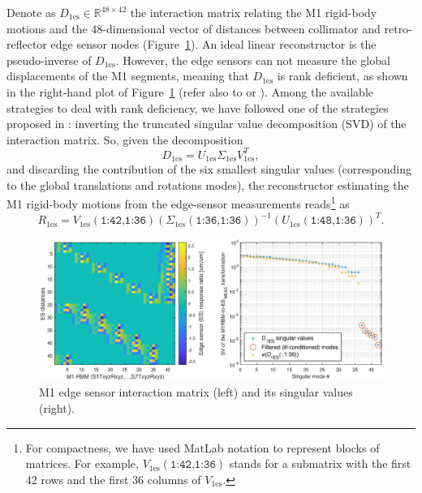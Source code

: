 \documentclass{gmto}
\begin{document}
Denote as $D_{1\text{es}} \in \mathbb{R}^{48 \times 42}$ the interaction matrix relating the M1 rigid-body motions and the $48$-dimensional vector of distances between collimator and retro-reflector edge sensor nodes (Figure~\ref{fig:D1es_sv}). An ideal linear reconstructor is the pseudo-inverse of $D_{1\text{es}}$. However, the edge sensors can not measure the global displacements of the M1 segments, meaning that $D_{1\text{es}}$ is rank deficient, as shown in the right-hand plot of Figure~\ref{fig:D1es_sv} (refer also to \cite{FWN.124} or \cite[Section~4.1]{PistonRej_QPacheco2019}). Among the available strategies to deal with rank deficiency, we have followed one of the strategies proposed in \cite[Section~2.2]{FWN.124}: inverting the truncated singular value decomposition (SVD) of the interaction matrix. So, given the decomposition 
$$D_{1\text{es}} = U_{1\text{es}} \Sigma_{1\text{es}} V_{1\text{es}}^T,$$
and discarding the contribution of the six smallest singular values (corresponding to the global translations and rotations modes), the reconstructor estimating the M1 rigid-body motions from the edge-sensor measurements reads\footnote{For compactness, we have used MatLab notation to represent blocks of matrices. For example, $V_{1\text{es}}(\texttt{1:42,1:36})$ stands for a submatrix with the first 42 rows and the first 36 columns of $V_{1\text{es}}$.} as
\begin{equation} \label{eq:R1es}
    R_{1\text{es}} = V_{1\text{es}}(\texttt{1:42,1:36}) \left(\Sigma_{1\text{es}}(\texttt{1:36,1:36})\right)^{-1} \left(U_{1\text{es}}(\texttt{1:48,1:36})\right)^T.
\end{equation}
%
\begin{figure}[!hbt]
  \centering
  \includegraphics[trim=60 0 60 0, clip, width=\textwidth]{D1es_map_sv.eps}
  \caption[M1 edge sensor interaction matrix]{M1 edge sensor interaction matrix (left) and its singular values (right).}
  \label{fig:D1es_sv}
\end{figure}
\end{document}
